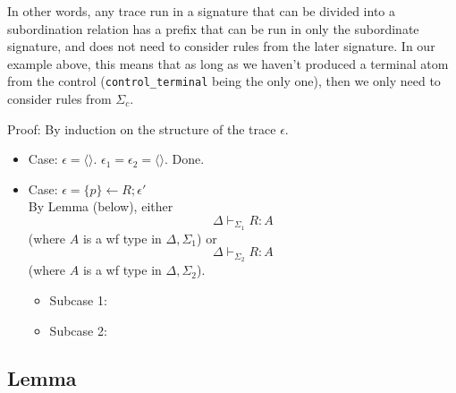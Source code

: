 \documentclass{article}
\newcommand{\eps}{\epsilon}
\newcommand{\nileps}{\langle\rangle}
\begin{document}
In other words, any trace run in a signature that can be divided into a
subordination relation has a prefix that can be run in only the subordinate
signature, and does not need to consider rules from the later signature. In
our example above, this means that as long as we haven't produced a
terminal atom from the control (\verb|control_terminal| being the only
one), then we only need to consider rules from $\Sigma_c$.

Proof: By induction on the structure of the trace $\eps$.

\begin{itemize}
\item Case: $\eps = \nileps$. $\eps_1 = \eps_2 = \nileps$. Done.
\item Case: $\eps = \{p\}\gets R; \eps'$\\
  By Lemma (below), either 
  \[ \Delta \vdash_{\Sigma_1} R : A \]
    (where $A$ is a wf type in $\Delta, \Sigma_1$)
  or
  \[ \Delta \vdash_{\Sigma_2} R : A \]
    (where $A$ is a wf type in $\Delta, \Sigma_2$).\\
  \begin{itemize}
  \item Subcase 1:
  \item Subcase 2:
  \end{itemize}
\end{itemize}

\subsection{Lemma}

% 
% 
\end{document}
